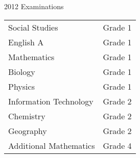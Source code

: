 \documentclass[10pt,a4paper]{altacv}
\begin{document}
\divider

2012 Examinations

\medskip
\begin{tabular}{ l c }
Social Studies & Grade 1\\
English A & Grade 1\\
Mathematics & Grade 1\\
Biology & Grade 1\\
Physics & Grade 1\\
Information Technology &  Grade 2\\
Chemistry & Grade 2\\
Geography & Grade 2\\
Additional Mathematics & Grade 4\\

\end{tabular}



\end{document}
